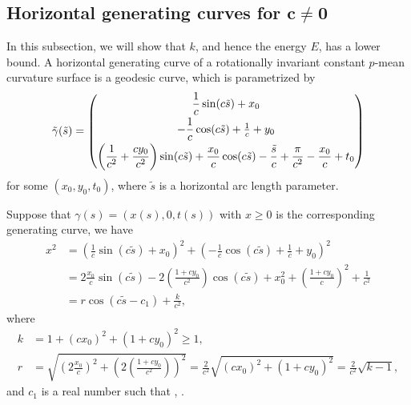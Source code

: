 \documentclass[pdftex]{sigma}
\numberwithin{equation}{section}
\begin{document}
\subsection[Horizontal generating curves for c neq 0]{Horizontal generating curves for $\boldsymbol{c\neq 0}$}

In this subsection, we will show that $k$, and hence the energy $E$, has a lower bound. A horizontal generating curve of a rotationally invariant constant $p$-mean curvature surface is a geodesic curve, which is parametrized by
\begin{equation}\label{gd}
\tilde{\gamma}(\tilde{s})=\left(\begin{matrix}
\dfrac{1}{c}\sin(c\tilde{s})+x_{0}\vspace{1mm}\\
-\dfrac{1}{c}\cos(c\tilde{s})+\frac{1}{c}+y_{0} \vspace{1mm}\\
\left(\dfrac{1}{c^2}+\dfrac{cy_{0}}{c^2}\right)\sin(c\tilde{s})+\dfrac{x_{0}}{c}\cos(c\tilde{s})-\dfrac{\tilde{s}}{c}+\dfrac{\pi}{c^2}-\dfrac{x_{0}}{c}+t_{0}\end{matrix} \right)
\end{equation}
for some $(x_{0},y_{0},t_{0})$, where $\tilde{s}$ is a horizontal arc length parameter.

Suppose that $\gamma(s)=(x(s),0,t(s))$ with $x\geq 0$ is the corresponding generating curve, we have
\begin{align*}
x^{2}&=\left(\frac{1}{c}\sin(c\tilde{s})+x_{0}\right)^{2}+\left(-\frac{1}{c}\cos(c\tilde{s})+\frac{1}{c}+y_{0}\right)^{2}\\
&=2\frac{x_{0}}{c}\sin(c\tilde{s})-2\left(\frac{1+cy_{0}}{c^2}\right)\cos(c\tilde{s})+x_{0}^{2}+\left(\frac{1+cy_{0}}{c}\right)^{2}+\frac{1}{c^2}\\
&=r\cos(c\tilde{s}-c_{1})+\frac{k}{c^2},
\end{align*}
 where
 \begin{align*}
 k&=1+(cx_{0})^{2}+(1+cy_{0})^{2}\geq 1,\\
 r&=\sqrt{\left(2\frac{x_{0}}{c}\right)^{2}+\left(2\left(\frac{1+cy_{0}}{c^2}\right)\right)^{2}}=\frac{2}{c^2}\sqrt{(cx_{0})^{2}+(1+cy_{0})^{2}}=\frac{2}{c^2}\sqrt{k-1},
 \end{align*}
 and $c_{1}$ is a real number such that
, .
\end{document}
